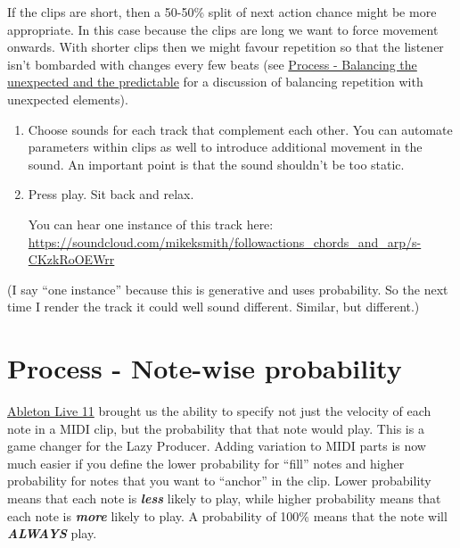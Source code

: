 \documentclass[
  12pt,
  letterpaper,
  oneside,
  open=any]{scrbook}
\begin{document}
If the clips are short, then a 50-50\% split of next action chance might
be more appropriate. In this case because the clips are long we want to
force movement onwards. With shorter clips then we might favour
repetition so that the listener isn't bombarded with changes every few
beats (see
\hyperref[009-Process-Balance_unexpected_and_predictable]{Process -
Balancing the unexpected and the predictable} for a discussion of
balancing repetition with unexpected elements).

\begin{enumerate}
\def\labelenumi{\arabic{enumi}.}
\setcounter{enumi}{7}
\item
  Choose sounds for each track that complement each other. You can
  automate parameters within clips as well to introduce additional
  movement in the sound. An important point is that the sound shouldn't
  be too static.
\item
  Press play. Sit back and relax.

  You can hear one instance of this track here:
  \href{https://soundcloud.com/mikeksmith/followactions_chords_and_arp/s-CKzkRoOEWrr?in=mikeksmith/sets/the-lazy-producer-recipes/s-PGMEWqfwKGz&si=e1846c9235ff47ad9ae0fa0cd5d52708&utm_source=clipboard&utm_medium=text&utm_campaign=social_sharing}{https://soundcloud.com/mikeksmith/followactions\_chords\_and\_arp/s-CKzkRoOEWrr}
\end{enumerate}

(I say ``one instance'' because this is generative and uses probability.
So the next time I render the track it could well sound different.
Similar, but different.)


\chapter{Process - Note-wise
probability}\label{002-Process-Note_wise_probability}

\href{https://www.ableton.com/en/live-manual/11/welcome-to-live/\#welcome-to-live}{Ableton
Live 11} brought us the ability to specify not just the velocity of each
note in a MIDI clip, but the probability that that note would play. This
is a game changer for the Lazy Producer. Adding variation to MIDI parts
is now much easier if you define the lower probability for ``fill''
notes and higher probability for notes that you want to ``anchor'' in
the clip. Lower probability means that each note is \textbf{\emph{less}}
likely to play, while higher probability means that each note is
\textbf{\emph{more}} likely to play. A probability of 100\% means that
the note will \textbf{\emph{ALWAYS}} play.
\end{document}
